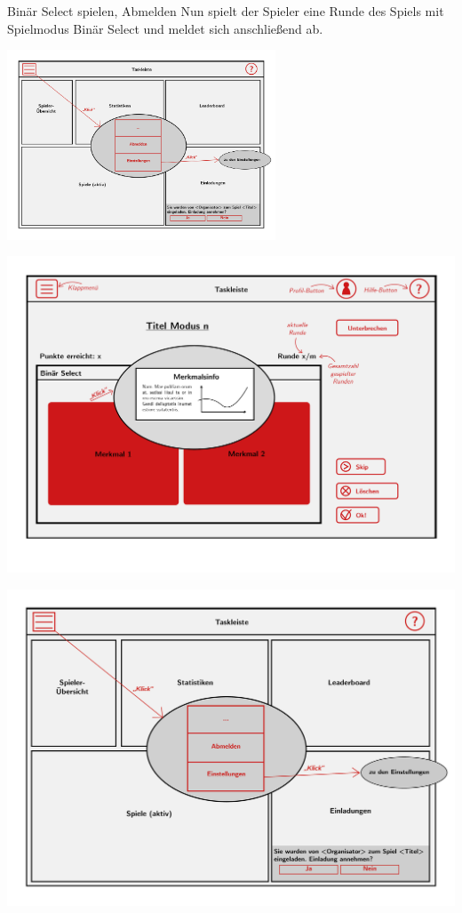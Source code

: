 \documentclass[xcolor=dvipsnames]{beamer}
\begin{document}
	\begin{frame}
		\begin{block}{Binär Select spielen, Abmelden}
		Nun spielt der Spieler eine Runde des Spiels mit Spielmodus Binär Select und meldet sich anschließend ab.
		\end{block}
		\includegraphics[width=8cm]{../../pictures/5_Spieler.jpg}
	\end{frame}
	\begin{frame}
	\includegraphics[width=\textwidth]{../../pictures/BinSelect.jpg}
	\end{frame}
	\begin{frame}
	\includegraphics[width=\textwidth]{../../pictures/5_Spieler.jpg}
	\end{frame}
\end{document}
